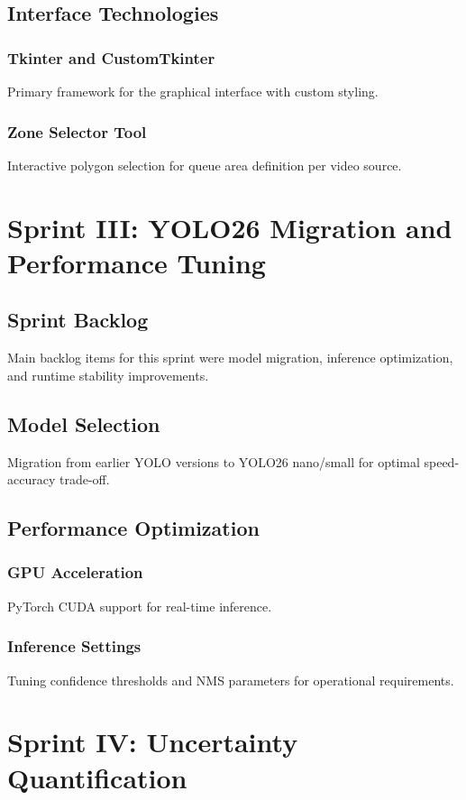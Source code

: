 \subsection{Interface Technologies}
\subsubsection{Tkinter and CustomTkinter}
Primary framework for the graphical interface with custom styling.

\subsubsection{Zone Selector Tool}
Interactive polygon selection for queue area definition per video source.

\section{Sprint III: YOLO26 Migration and Performance Tuning}

\subsection{Sprint Backlog}
Main backlog items for this sprint were model migration, inference optimization, and runtime stability improvements.

\subsection{Model Selection}
Migration from earlier YOLO versions to YOLO26 nano/small for optimal speed-accuracy trade-off.

\subsection{Performance Optimization}
\subsubsection{GPU Acceleration}
PyTorch CUDA support for real-time inference.

\subsubsection{Inference Settings}
Tuning confidence thresholds and NMS parameters for operational requirements.

\section{Sprint IV: Uncertainty Quantification}

